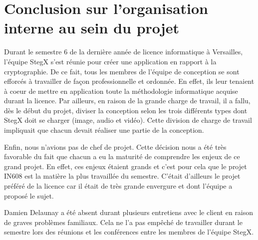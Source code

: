 \documentclass[11pt]{article}
\begin{document}
\section{Conclusion sur l'organisation interne au sein du projet}

Durant le semestre 6 de la dernière année de licence informatique à Versailles, 
l'équipe StegX s'est réunie pour créer une application en rapport à la 
cryptographie. 
De ce fait, tous les membres de l'équipe de conception se sont efforcés à
travailler de façon professionnelle et ordonnée. En effet, ils leur tenaient 
à coeur de mettre en application toute la méthodologie informatique acquise 
durant la licence. 
Par ailleurs, en raison de la grande charge de travail, il a fallu, dès le 
début du projet, diviser la conception selon les trois différents types 
dont StegX doit se charger (image, audio et vidéo). 
Cette division de charge de travail impliquait que chacun devait réaliser 
une partie de la conception. 

Enfin, nous n'avions pas de chef de projet. Cette décision nous a été très 
favorable du fait que chacun a eu la maturité de comprendre les enjeux de 
ce grand projet. En effet, ces enjeux étaient grands et c'est pour cela 
que le projet IN608 est la matière la plus travaillée du semestre. C'était 
d'ailleurs le projet préféré de la licence car il était de très grande 
envergure et dont l'équipe a proposé le sujet. 

Damien Delaunay a été absent durant plusieurs entretiens avec le client 
en raison de graves problèmes familiaux. Cela ne l'a pas empêché de travailler 
durant le semestre lors des réunions et les conférences entre les membres 
de l'équipe StegX. 
\end{document}
